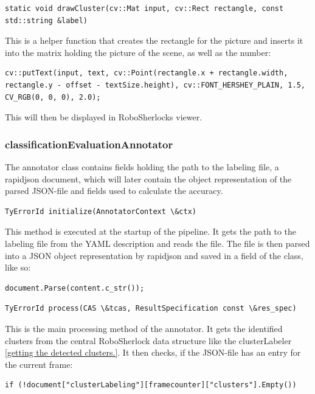 \documentclass[main.tex]{subfiles}
\begin{document}
\begin{lstlisting}
static void drawCluster(cv::Mat input, cv::Rect rectangle, const std::string &label)
\end{lstlisting}

This is a helper function that creates the rectangle for the picture and inserts it into the matrix holding the picture of the scene, as well as the number:

\begin{lstlisting}
cv::putText(input, text, cv::Point(rectangle.x + rectangle.width, rectangle.y - offset - textSize.height), cv::FONT_HERSHEY_PLAIN, 1.5, CV_RGB(0, 0, 0), 2.0);
\end{lstlisting}

This will then be displayed in RoboSherlocks viewer.



\subsubsection{classificationEvaluationAnnotator}
The annotator class contains fields holding the path to the labeling file, a rapidjson document, which will later contain the object representation of the parsed JSON-file and fields used to calculate the accuracy.

\begin{lstlisting}
TyErrorId initialize(AnnotatorContext \&ctx)
\end{lstlisting}

This method is executed at the startup of the pipeline.  It gets the path to the labeling file from the YAML description and reads the file. The file is then parsed into a JSON object representation by rapidjson and saved in a field of the class, like so:

\begin{lstlisting}
document.Parse(content.c_str());
\end{lstlisting}

\begin{lstlisting}
TyErrorId process(CAS \&tcas, ResultSpecification const \&res_spec)
\end{lstlisting}

This is the main processing method of the annotator. It gets the identified clusters from the central RoboSherlock data structure like the clusterLabeler \ref{getting the detected clusters.}. It then checks, if the JSON-file has an entry for the current frame: 

\begin{lstlisting}
if (!document["clusterLabeling"][framecounter]["clusters"].Empty())
\end{lstlisting}
\end{document}

